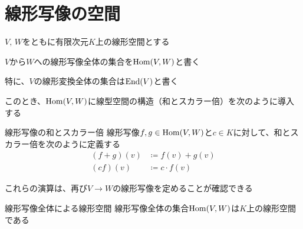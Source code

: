 \documentclass[../../../topic_linear-algebra]{subfiles}
\begin{document}
\sectionline
\section{線形写像の空間}

$V,\,W$をともに有限次元$K$上の線形空間とする

\br

$V$から$W$への線形写像全体の集合を$\operatorname{Hom}(V,W)$と書く

特に、$V$の線形変換全体の集合は$\operatorname{End}(V)$と書く

\br

このとき、$\operatorname{Hom}(V,W)$に線型空間の構造（和とスカラー倍）を次のように導入する

\begin{definition}{線形写像の和とスカラー倍}
  線形写像$f,g\in\operatorname{Hom}(V,W)$と$c\in K$に対して、和とスカラー倍を次のように定義する
  \begin{align*}
    (f+g)(v) & \coloneq f(v) + g(v) \\
    (cf)(v)  & \coloneq c\cdot f(v)
  \end{align*}
\end{definition}

\br

これらの演算は、再び$V \to W$の線形写像を定めることが確認できる

\begin{theorem}{線形写像全体による線形空間}\label{thm:hom-space}
  線形写像全体の集合$\operatorname{Hom}(V,W)$は$K$上の線形空間である
\end{theorem}
\end{document}
